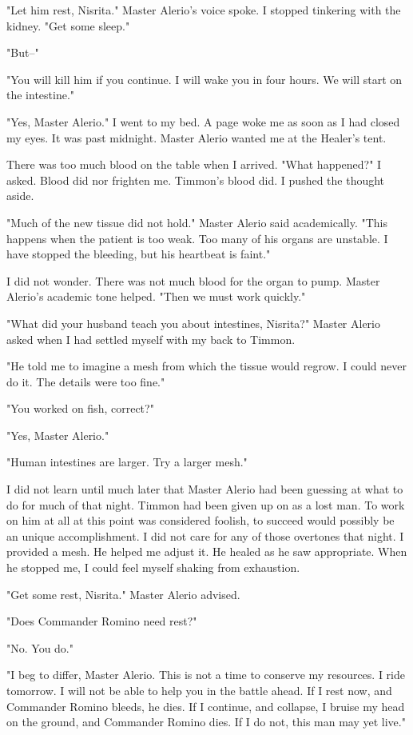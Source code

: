 \documentclass{article}
\begin{document}
"Let him rest, Nisrita." Master Alerio's voice spoke. I stopped tinkering with the kidney. "Get some sleep."

"But--" 

"You will kill him if you continue. I will wake you in four hours. We will start on the intestine."

"Yes, Master Alerio." I went to my bed. A page woke me as soon as I had closed my eyes. It was past midnight. Master Alerio wanted me at the Healer's tent. 

There was too much blood on the table when I arrived. "What happened?" I asked. Blood did nor frighten me. Timmon's blood did. I pushed the thought aside.

"Much of the new tissue did not hold." Master Alerio said academically. "This happens when the patient is too weak. Too many of his organs are unstable. I have stopped the bleeding, but his heartbeat is faint."

I did not wonder. There was not much blood for the organ to pump. Master Alerio's academic tone helped. "Then we must work quickly." 

"What did your husband teach you about intestines, Nisrita?" Master Alerio asked when I had settled myself with my back to Timmon.

"He told me to imagine a mesh from which the tissue would regrow. I could never do it. The details were too fine."

"You worked on fish, correct?"

"Yes, Master Alerio."

"Human intestines are larger. Try a larger mesh."

I did not learn until much later that Master Alerio had been guessing at what to do for much of that night. Timmon had been given up on as a lost man. To work on him at all at this point was considered foolish, to succeed would possibly be an unique accomplishment. I did not care for any of those overtones that night. I provided a mesh. He helped me adjust it. He healed as he saw appropriate. When he stopped me, I could feel myself shaking from exhaustion. 

"Get some rest, Nisrita." Master Alerio advised. 

"Does Commander Romino need rest?"

"No. You do."

"I beg to differ, Master Alerio. This is not a time to conserve my resources. I ride tomorrow. I will not be able to help you in the battle ahead. If I rest now, and Commander Romino bleeds, he dies. If I continue, and collapse, I bruise my head on the ground, and Commander Romino dies. If I do not, this man may yet live."
\end{document}
